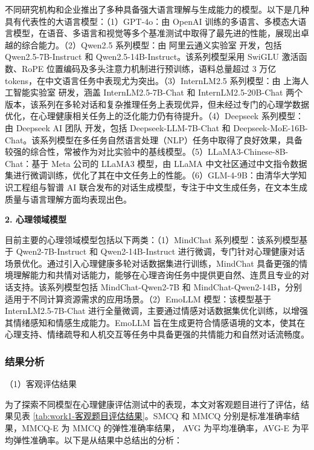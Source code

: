 
不同研究机构和企业推出了多种具备强大语言理解与生成能力的模型。以下是几种具有代表性的大语言模型：（1）GPT-4o：由 OpenAI 训练的多语言、多模态大语言模型，在语音、多语言和视觉等多个基准测试中取得了最先进的性能，展现出卓越的综合能力。（2）Qwen2.5 系列模型：由 阿里云通义实验室 开发，包括 Qwen2.5-7B-Instruct 和 Qwen2.5-14B-Instruct。该系列模型采用 SwiGLU 激活函数、RoPE 位置编码及多头注意力机制进行预训练，语料总量超过 3 万亿 tokens，在中文语言任务中表现尤为突出。（3）InternLM2.5 系列模型：由 上海人工智能实验室 研发，涵盖 InternLM2.5-7B-Chat 和 InternLM2.5-20B-Chat 两个版本，该系列在多轮对话和复杂推理任务上表现优异，但未经过专门的心理学数据优化，在心理健康相关任务上的泛化能力仍有待提升。（4）Deepseek 系列模型：由 Deepseek AI 团队 开发，包括 Deepseek-LLM-7B-Chat 和 Deepseek-MoE-16B-Chat。该系列模型在多任务自然语言处理（NLP）任务中取得了良好效果，具备较强的综合性，常被作为对比实验中的基线模型。（5）LLaMA3-Chinese-8B-Chat：基于 Meta 公司的 LLaMA3 模型，由 LLaMA 中文社区通过中文指令数据集进行微调训练，优化了其在中文任务上的性能。（6）GLM-4-9B：由清华大学知识工程组与智谱 AI 联合发布的对话生成模型，专注于中文生成任务，在文本生成质量与语言理解方面均表现出色。

\textbf{2. 心理领域模型}

目前主要的心理领域模型包括以下两类：（1）MindChat 系列模型：该系列模型基于 Qwen2-7B-Instruct 和 Qwen2-14B-Instruct 进行微调，专门针对心理健康对话场景优化。通过引入心理健康多轮对话数据集进行训练，MindChat 具备更强的情境理解能力和共情对话能力，能够在心理咨询任务中提供更自然、连贯且专业的对话支持。该系列模型包括 MindChat-Qwen2-7B 和 MindChat-Qwen2-14B，分别适用于不同计算资源需求的应用场景。（2）EmoLLM 模型：该模型基于 InternLM2.5-7B-Chat 进行全量微调，主要通过情感对话数据集优化训练，以增强其情绪感知和情感生成能力。EmoLLM 旨在生成更符合情感语境的文本，使其在心理支持、情绪疏导和人机交互等任务中具备更强的共情能力和自然对话流畅度。

\subsubsection{结果分析}

（1）客观评估结果

为了探索不同模型在心理健康评估测试中的表现，本文对客观题目进行了评估，结果见表 \ref{tab:work1-客观题目评估结果}。SMCQ 和 MMCQ 分别是标准准确率结果，MMCQ-E 为 MMCQ 的弹性准确率结果， AVG 为平均准确率，AVG-E 为平均弹性准确率。以下是从结果中总结出的分析：

